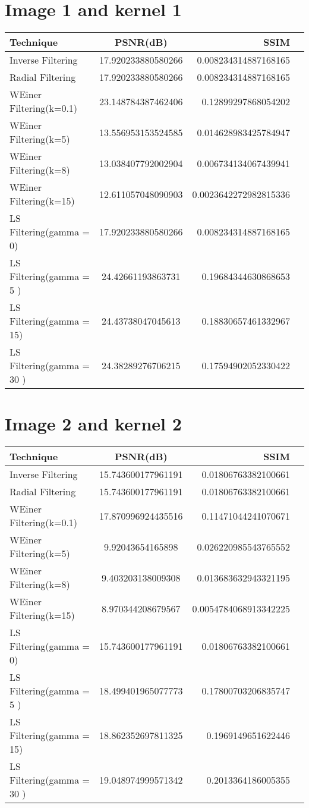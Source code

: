\documentclass{article}
\begin{document}
\section{Image 1 and kernel  1}
\begin{tabular}{|l|c|r|p{5cm} }
\hline
    Technique & PSNR(dB) & SSIM\\
    \hline
    Inverse Filtering & 17.920233880580266 & 0.008234314887168165\\
    \hline
    Radial Filtering & 17.920233880580266 & 0.008234314887168165\\
    \hline
    WEiner Filtering(k=0.1) & 23.148784387462406 & 0.12899297868054202\\
    \hline
    WEiner Filtering(k=5) & 13.556953153524585 & 0.014628983425784947\\
    \hline
    WEiner Filtering(k=8) & 13.038407792002904 & 0.006734134067439941\\
    \hline
    WEiner Filtering(k=15) & 12.611057048090903 & 0.0023642272982815336\\
    \hline
    LS Filtering(gamma = 0) & 17.920233880580266 & 0.008234314887168165\\
    \hline
    LS Filtering(gamma = 5 ) & 24.42661193863731 & 0.19684344630868653\\
    \hline
    LS Filtering(gamma = 15) & 24.43738047045613 &  0.18830657461332967\\
    \hline
    LS Filtering(gamma = 30 ) & 24.38289276706215 & 0.17594902052330422\\
    \hline
\end{tabular}
\section{Image 2 and kernel 2}
\begin{tabular}{|l|c|r|p{8cm} }
    \hline
    Technique & PSNR(dB) & SSIM\\
    \hline
    Inverse Filtering & 15.743600177961191 & 0.01806763382100661\\
    \hline
    Radial Filtering & 15.743600177961191 & 0.01806763382100661\\
    \hline
    WEiner Filtering(k=0.1) & 17.870996924435516 &  0.11471044241070671\\
    \hline
    WEiner Filtering(k=5) & 9.92043654165898 & 0.026220985543765552\\
    \hline
    WEiner Filtering(k=8) & 9.403203138009308 & 0.013683632943321195\\
    \hline
    WEiner Filtering(k=15) & 8.970344208679567 & 0.0054784068913342225\\
    \hline
    LS Filtering(gamma = 0) & 15.743600177961191 & 0.01806763382100661\\
    \hline
    LS Filtering(gamma = 5 ) & 18.499401965077773 & 0.17800703206835747\\
    \hline
    LS Filtering(gamma = 15) &18.862352697811325 &  0.1969149651622446\\
    \hline
    LS Filtering(gamma = 30 ) & 19.048974999571342 & 0.2013364186005355\\
    \hline
 \end{tabular}
\end{document}
